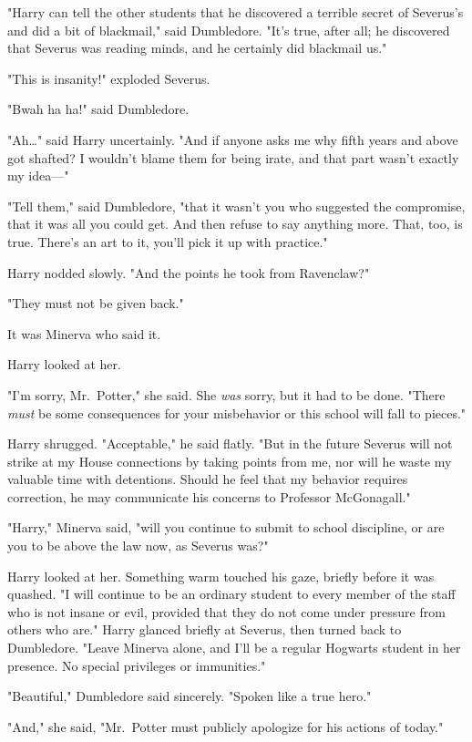 "Harry can tell the other students that he discovered a terrible secret of 
Severus's and did a bit of blackmail," said Dumbledore. "It's true, after all; 
he discovered that Severus was reading minds, and he certainly did blackmail 
us."

"This is insanity!" exploded Severus.

"Bwah ha ha!" said Dumbledore.

"Ah{\ldots}" said Harry uncertainly. "And if anyone asks me why fifth years and 
above got shafted? I wouldn't blame them for being irate, and that part wasn't 
exactly my idea---"

"Tell them," said Dumbledore, "that it wasn't you who suggested the compromise, 
that it was all you could get. And then refuse to say anything more. That, too, 
is true. There's an art to it, you'll pick it up with practice."

Harry nodded slowly. "And the points he took from Ravenclaw?"

"They must not be given back."

It was Minerva who said it.

Harry looked at her.

"I'm sorry, Mr.~Potter," she said. She \emph{was} sorry, but it had to be done. 
"There \emph{must} be some consequences for your misbehavior or this school 
will fall to pieces."

Harry shrugged. "Acceptable," he said flatly. "But in the future Severus will 
not strike at my House connections by taking points from me, nor will he waste 
my valuable time with detentions. Should he feel that my behavior requires 
correction, he may communicate his concerns to Professor McGonagall."

"Harry," Minerva said, "will you continue to submit to school discipline, or 
are you to be above the law now, as Severus was?"

Harry looked at her. Something warm touched his gaze, briefly before it was 
quashed. "I will continue to be an ordinary student to every member of the 
staff who is not insane or evil, provided that they do not come under pressure 
from others who are." Harry glanced briefly at Severus, then turned back to 
Dumbledore. "Leave Minerva alone, and I'll be a regular Hogwarts student in her 
presence. No special privileges or immunities."

"Beautiful," Dumbledore said sincerely. "Spoken like a true hero."

"And," she said, "Mr.~Potter must publicly apologize for his actions of today."

